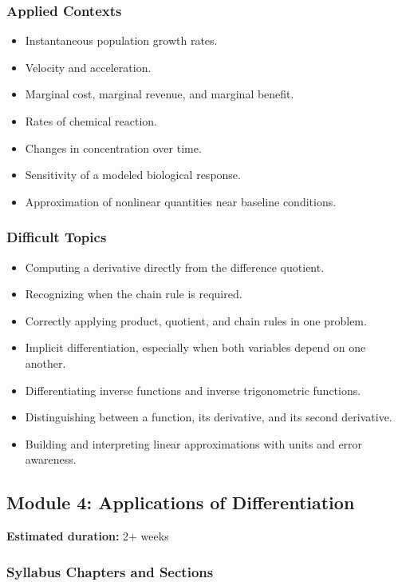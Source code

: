 \documentclass[11pt]{article}
\begin{document}
\subsubsection{Applied Contexts}

\begin{itemize}
    \item Instantaneous population growth rates.
    \item Velocity and acceleration.
    \item Marginal cost, marginal revenue, and marginal benefit.
    \item Rates of chemical reaction.
    \item Changes in concentration over time.
    \item Sensitivity of a modeled biological response.
    \item Approximation of nonlinear quantities near baseline conditions.
\end{itemize}

\subsubsection{Difficult Topics}

\begin{itemize}
    \item Computing a derivative directly from the difference quotient.
    \item Recognizing when the chain rule is required.
    \item Correctly applying product, quotient, and chain rules in one problem.
    \item Implicit differentiation, especially when both variables depend on one another.
    \item Differentiating inverse functions and inverse trigonometric functions.
    \item Distinguishing between a function, its derivative, and its second derivative.
    \item Building and interpreting linear approximations with units and error awareness.
\end{itemize}

\subsection{Module 4: Applications of Differentiation}

\textbf{Estimated duration:} 2+ weeks

\subsubsection{Syllabus Chapters and Sections}
\end{document}
